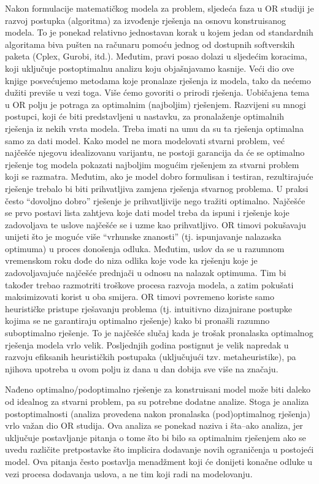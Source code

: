 \documentclass[a4paper, utf8, 11pt, colorlinks]{book}
\begin{document}
Nakon formulacije matematičkog modela za problem, sljedeća faza u OR studiji je razvoj postupka (algoritma) za
izvođenje rješenja na osnovu konstruisanog modela. To je ponekad relativno jednostavan korak u kojem jedan od standardnih algoritama biva pušten na računaru pomoću jednog od   dostupnih softverskih paketa (Cplex, Gurobi, itd.). Međutim, pravi posao dolazi u sljedećim koracima, koji uključuje postoptimalnu
analizu koju objašnjavamo kasnije. Veći dio ove knjige posvećujemo metodama koje pronalaze rješenja iz modela, tako da nećemo dužiti previše u vezi toga. Više ćemo govoriti o prirodi   rješenja.  Uobičajena tema u OR polju je potraga za optimalnim (najboljim) rješenjem. Razvijeni su mnogi postupci, koji će biti predstavljeni u nastavku, za pronala\-ženje optimalnih rješenja iz nekih vrsta modela. Treba imati na umu da su ta rješenja optimalna samo za dati model. Kako model ne mora modelovati stvarni problem, već najčešće njegovu idealizovanu varijantu, ne postoji garancija da će se optimalno rješenje tog modela pokazati najboljim mogućim rješenjem za stvarni problem koji se razmatra. Međutim, ako je
model dobro formulisan i testiran, rezultirajuće rješenje trebalo bi biti prihvatljiva zamjena rješenja stvarnog problema. U praksi često ``dovoljno dobro'' rješenje je prihvatljivije nego tražiti optimalno. Najčešće se prvo postavi lista zahtjeva koje dati model treba da ispuni i rješenje koje zadovoljava te uslove najčešće se i uzme kao prihvatljivo. OR timovi pokušavaju unijeti što je moguće više ``vrhunske znanosti''  (tj. ispunjavanje nalazaska optimuma) u proces donošenja odluka. Međutim,  uslov da se u razumnom vremenskom roku dođe do niza odlika koje vode ka rješenju koje je zadovoljavajuće najčešće prednjači u odnosu na nalazak optimuma. Tim bi također trebao razmotriti troškove procesa razvoja modela, a zatim
pokušati maksimizovati korist u oba smijera. OR timovi povremeno koriste samo heurističke pristupe rješavanju problema (tj. intuitivno dizajnirane postupke kojima se ne garantiraju optimalno rješenje) kako bi pronašli razumno suboptimalno rješenje. To je najčešće slučaj kada je trošak pronalaska  optimalnog rješenja  modela vrlo velik. Posljednjih godina postignut je velik napredak u razvoju efiksanih heurističkih postupaka (uključujući tzv.
metaheuristike), pa njihova upotreba u ovom polju iz dana u dan  dobija sve više na značaju.  

Nađeno optimalno/podoptimalno rješenje za konstruisani model može biti daleko od idealnog za stvarni problem, pa su potrebne dodatne analize. Stoga je analiza postoptimalnosti (analiza provedena nakon pronalaska (pod)optimalnog rješenja) vrlo važan dio   OR studija.  Ova analiza se ponekad naziva i šta--ako analiza, jer uključuje postavljanje pitanja o tome što bi bilo sa optimalnim rješenjem ako se uvedu različite pretpostavke što implicira dodavanje novih ograničenja u postojeći model. Ova pitanja često postavlja menadžment koji će donijeti konačne odluke u vezi procesa dodavanja uslova, a ne tim koji radi na modelovanju.
\end{document}
